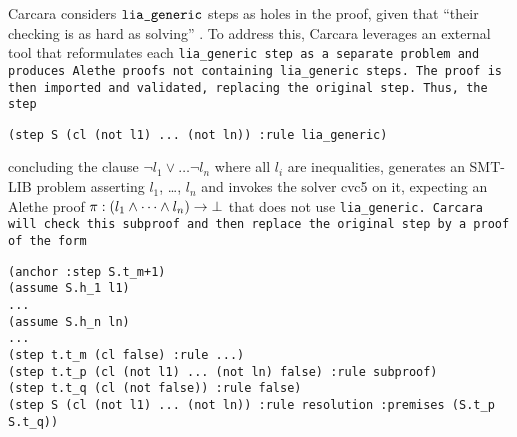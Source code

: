 Carcara considers $\tt{lia\_generic}$ steps as holes in the proof, given that ``their checking is as hard as solving'' \cite[\S 3.2]{carcara}.
To address this, Carcara leverages an external tool that reformulates each \tt{lia\_generic} step as a separate problem and produces Alethe proofs not containing \tt{lia\_generic} steps.
The proof is then imported and validated, replacing the original step.
Thus, the step
%
\begin{lstlisting}[language=SMT]
    (step S (cl (not l1) ... (not ln)) :rule lia_generic)
\end{lstlisting}
%
concluding the clause $\neg l_1 \lor \dots \neg l_n$ where all $l_i$ are inequalities, generates an SMT-LIB problem asserting $l_1$, \dots, $l_n$ and invokes the solver cvc5 on it, expecting an Alethe proof $\pi : (l_1 \land \dots \land l_n) \ra \bot$
that does not use \tt{lia\_generic}. Carcara will check this subproof and then replace the original step by a proof of the form

\begin{lstlisting}[language=SMT,caption={Elaboration of \tt{lia\_generic}},label={lst:elab_lia}]
(anchor :step S.t_m+1)
(assume S.h_1 l1)
...
(assume S.h_n ln)
...
(step t.t_m (cl false) :rule ...)
(step t.t_p (cl (not l1) ... (not ln) false) :rule subproof)
(step t.t_q (cl (not false)) :rule false)
(step S (cl (not l1) ... (not ln)) :rule resolution :premises (S.t_p S.t_q))
\end{lstlisting}

